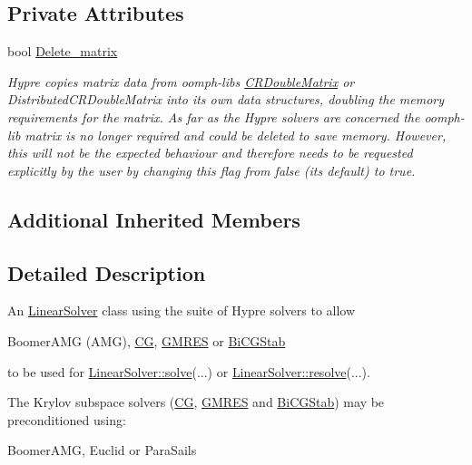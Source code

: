 \subsection*{Private Attributes}
\begin{DoxyCompactItemize}
\item 
bool \hyperlink{classoomph_1_1HypreSolver_a79047c84718f95a88ba3c41e1d3963e7}{Delete\+\_\+matrix}
\begin{DoxyCompactList}\small\item\em Hypre copies matrix data from oomph-\/lib\textquotesingle{}s \hyperlink{classoomph_1_1CRDoubleMatrix}{C\+R\+Double\+Matrix} or Distributed\+C\+R\+Double\+Matrix into its own data structures, doubling the memory requirements for the matrix. As far as the Hypre solvers are concerned the oomph-\/lib matrix is no longer required and could be deleted to save memory. However, this will not be the expected behaviour and therefore needs to be requested explicitly by the user by changing this flag from false (its default) to true. \end{DoxyCompactList}\end{DoxyCompactItemize}
\subsection*{Additional Inherited Members}


\subsection{Detailed Description}
An \hyperlink{classoomph_1_1LinearSolver}{Linear\+Solver} class using the suite of Hypre solvers to allow

Boomer\+A\+MG (A\+MG), \hyperlink{classoomph_1_1CG}{CG}, \hyperlink{classoomph_1_1GMRES}{G\+M\+R\+ES} or \hyperlink{classoomph_1_1BiCGStab}{Bi\+C\+G\+Stab}

to be used for \hyperlink{classoomph_1_1LinearSolver_a15ce22542b74ed1826ea485edacbeb6e}{Linear\+Solver\+::solve}(...) or \hyperlink{classoomph_1_1LinearSolver_a3b310d08333033edc119b2a5bd7dcbfb}{Linear\+Solver\+::resolve}(...).

The Krylov subspace solvers (\hyperlink{classoomph_1_1CG}{CG}, \hyperlink{classoomph_1_1GMRES}{G\+M\+R\+ES} and \hyperlink{classoomph_1_1BiCGStab}{Bi\+C\+G\+Stab}) may be preconditioned using\+: \begin{DoxyVerb}    BoomerAMG, Euclid or ParaSails
\end{DoxyVerb}


